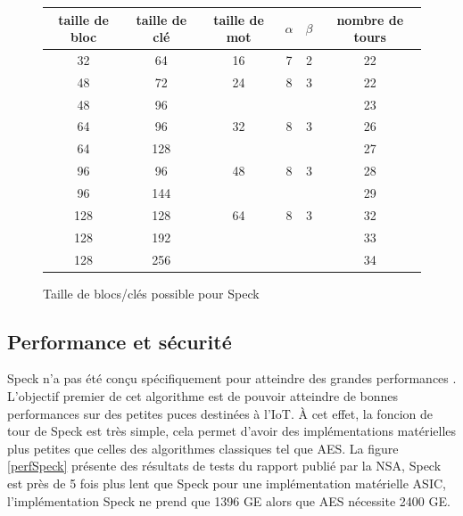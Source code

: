 \begin{figure}[H]
	\centering
	\bgroup
	\def\arraystretch{1.2}
	\begin{tabular}{ccc|cc|c}
		taille de bloc & taille de clé & taille de mot & $\alpha$ & $\beta$ & nombre de tours \\
		\hline
		32             & 64            & 16            & 7        & 2       & 22              \\
		\hline
		48             & 72            & 24            & 8        & 3       & 22              \\
		48             & 96            &               &          &         & 23              \\
		\hline
		64             & 96            & 32            & 8        & 3       & 26              \\
		64             & 128           &               &          &         & 27              \\
		\hline
		96             & 96            & 48            & 8        & 3       & 28              \\
		96             & 144           &               &          &         & 29              \\
		\hline
		128            & 128           & 64            & 8        & 3       & 32              \\
		128            & 192           &               &          &         & 33              \\
		128            & 256           &               &          &         & 34              \\
	\end{tabular}
	\egroup
	\caption{Taille de blocs/clés possible pour Speck}
	\label{tailleSpeck}
\end{figure}

\vspace{0.5cm}

\subsection{Performance et sécurité}

Speck n'a pas été conçu spécifiquement pour atteindre des grandes
performances \cite{speck_families}. L'objectif premier de cet algorithme
est de pouvoir atteindre de bonnes performances sur des petites puces
destinées à l'IoT. À cet effet, la foncion de tour de Speck est très simple,
cela permet d'avoir des implémentations matérielles plus petites que
celles des algorithmes classiques tel que AES. La figure \ref{perfSpeck}
présente des résultats de tests du rapport \cite{speck_micro} publié par la NSA,
Speck est près de 5 fois plus lent que Speck pour une implémentation matérielle
ASIC, l'implémentation Speck ne prend que 1396 GE alors que AES
nécessite 2400 GE.

